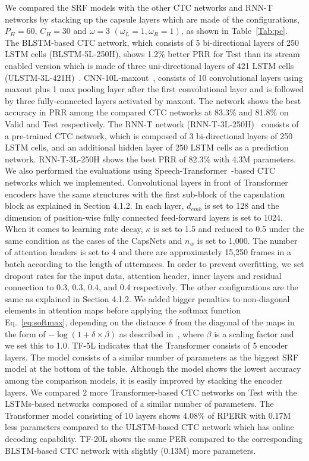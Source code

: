 \documentclass[review]{elsarticle}
\begin{document}
We compared the SRF models with the other CTC networks and RNN-T networks by stacking up the capsule layers which are made of the configurations, $P_H=60$, $C_H=30$ and $\omega=3$ $(\omega_L=1, \omega_R=1)$, as shown in Table~\ref{Tab:pc}.
The BLSTM-based CTC network, which consists of 5 bi-directional layers of 250 LSTM cells (BLSTM-5L-250H), shows 1.2\% better PRR for Test than its stream enabled version which is made of three uni-directional layers of 421 LSTM cells (ULSTM-3L-421H)~\citep{DBLP:conf/icassp/GravesMH13}.
CNN-10L-maxout~\citep{DBLP:conf/interspeech/ZhangPBZLBC16}, consists of 10 convolutional layers using maxout plus 1 max pooling layer after the first convolutional layer and is followed by three fully-connected layers activated by maxout.
The network shows the best accuracy in PRR among the compared CTC networks at 83.3\% and 81.8\% on Valid and Test respectively.
The RNN-T network (RNN-T-3L-250H)~\citep{DBLP:conf/icassp/GravesMH13} consists of a pre-trained CTC network, which is composed of 3 bi-directional layers of 250 LSTM cells, and an additional hidden layer of 250 LSTM cells as a prediction network.
RNN-T-3L-250H shows the best PRR of 82.3\% with 4.3M parameters.
We also performed the evaluations using Speech-Transformer~\citep{8462506}-based CTC networks which we implemented.
Convolutional layers in front of Transformer encoders have the same structures with the first sub-block of the capsulation block as explained in Section 4.1.2.
In each layer, $d_{emb}$ is set to 128 and the dimension of position-wise fully connected feed-forward layers is set to 1024. 
When it comes to learning rate decay, $\kappa$ is set to 1.5 and reduced to 0.5 under the same condition as the cases of the CapsNets and $n_{w}$ is set to 1,000.
The number of attention headers is set to 4 and there are approximately 15,250 frames in a batch according to the length of utterances.
In order to prevent overfitting, we set dropout rates for the input data, attention header, inner layers and residual connection to 0.3, 0.3, 0.4, and 0.4 respectively.
The other configurations are the same as explained in Section 4.1.2.
We added bigger penalties to non-diagonal elements in attention maps before applying the softmax function Eq.~\ref{eq:softmax}, depending on the distance $\delta$ from the diagonal of the maps in the form of $-\log(1+\delta \times \beta)$ as described in~\citep{8462506}, where $\beta$ is a scaling factor and we set this to 1.0.
TF-5L indicates that the Transformer consists of 5 encoder layers. The model consists of a similar number of parameters as the biggest SRF model at the bottom of the table.
Although the model shows the lowest accuracy among the comparison models, it is easily improved by stacking the encoder layers.
We compared 2 more Transformer-based CTC networks on Test with the LSTMs-based networks composed of a similar number of parameters.
The Transformer model consisting of 10 layers shows 4.08\% of RPERR with 0.17M less parameters compared to the ULSTM-based CTC network which has online decoding capability.
TF-20L shows the same PER compared to the corresponding BLSTM-based CTC network with slightly (0.13M) more parameters.
\end{document}

